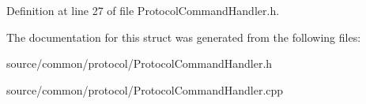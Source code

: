 Definition at line 27 of file Protocol\-Command\-Handler.\-h.



The documentation for this struct was generated from the following files\-:\begin{DoxyCompactItemize}
\item 
source/common/protocol/Protocol\-Command\-Handler.\-h\item 
source/common/protocol/Protocol\-Command\-Handler.\-cpp\end{DoxyCompactItemize}
